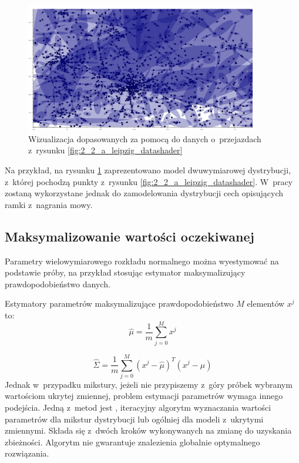 \begin{figure}[H]
    \centering
    \includegraphics[width=0.9\textwidth]{images/2_2_a_leipzig_gmm}
    \caption{Wizualizacja  dopasowanych za pomocą  do danych o~przejazdach z~rysunku \ref{fig:2_2_a_leipzig_datashader}}
    \label{fig:2_2_a_leipzig_gmm}
\end{figure}

Na przykład, na rysunku \ref{fig:2_2_a_leipzig_gmm} zaprezentowano model  dwuwymiarowej dystrybucji,
z~której pochodzą punkty z~rysunku \ref{fig:2_2_a_leipzig_datashader}. W~pracy  zostaną wykorzystane
jednak do zamodelowania dystrybucji cech opisujących ramki z~nagrania mowy.

\subsection{Maksymalizowanie wartości oczekiwanej}\label{sec:expectation_maximization}

Parametry wielowymiarowego rozkładu normalnego można wyestymować na podstawie próby, na przykład
stosując estymator maksymalizujący prawdopodobieństwo danych.

Estymatory parametrów maksymalizujące prawdopodobieństwo $M$ elementów $x^j$ to:
$$\hat{\mu} = \frac{1}{m} \sum_{j=0}^M x^{j}$$

$$\hat{\Sigma} = \frac{1}{m} \sum_{j=0}^M (x^{j} - \hat{\mu})^T (x^{j} - \hat{\mu})$$
Jednak w~przypadku mikstury, jeżeli nie przypiszemy z~góry próbek wybranym wartościom ukrytej zmiennej, problem
estymacji parametrów wymaga innego podejścia. Jedną z~metod jest , iteracyjny
algorytm wyznaczania wartości parametrów dla mikstur dystrybucji lub ogólniej dla modeli z~ukrytymi zmiennymi.
Składa się z~dwóch kroków wykonywanych na zmianę do uzyskania zbieżności.  Algorytm nie gwarantuje znalezienia
globalnie optymalnego rozwiązania.


